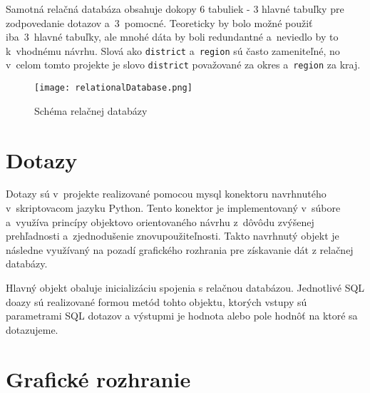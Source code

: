 \documentclass [11pt, a4paper]{article}
\begin{document}
Samotná relačná databáza obsahuje dokopy 6 tabuliek - 3 hlavné tabuľky pre zodpovedanie dotazov a~3~pomocné. Teoreticky by bolo možné použiť iba~3~hlavné tabuľky, ale mnohé dáta by boli redundantné a~neviedlo by to k~vhodnému návrhu. Slová ako \texttt{district} a~\texttt{region} sú často zameniteľné, no v~celom tomto projekte je slovo \texttt{district} považované za okres a~\texttt{region} za kraj.

\begin{figure}[H]
\begin{center}
\texttt{[image: relationalDatabase.png]}
\caption{Schéma relačnej databázy}
\end{center}
\end{figure}

\section*{Dotazy}
Dotazy sú v~projekte realizované pomocou mysql konektoru navrhnutého v~skriptovacom jazyku Python. Tento konektor je implementovaný v~súbore  a~využíva princípy objektovo orientovaného návrhu z~dôvôdu zvýšenej prehľadnosti a~zjednodušenie znovupoužiteľnosti. Takto navrhnutý objekt je následne využívaný na pozadí grafického rozhrania pre získavanie dát z relačnej databázy.

Hlavný objekt obaluje inicializáciu spojenia s relačnou databázou. Jednotlivé SQL doazy sú realizované formou metód tohto objektu, ktorých vstupy sú parametrami SQL dotazov a výstupmi je hodnota alebo pole hodnôť na ktoré sa dotazujeme.

\section*{Grafické rozhranie}
\end{document}
